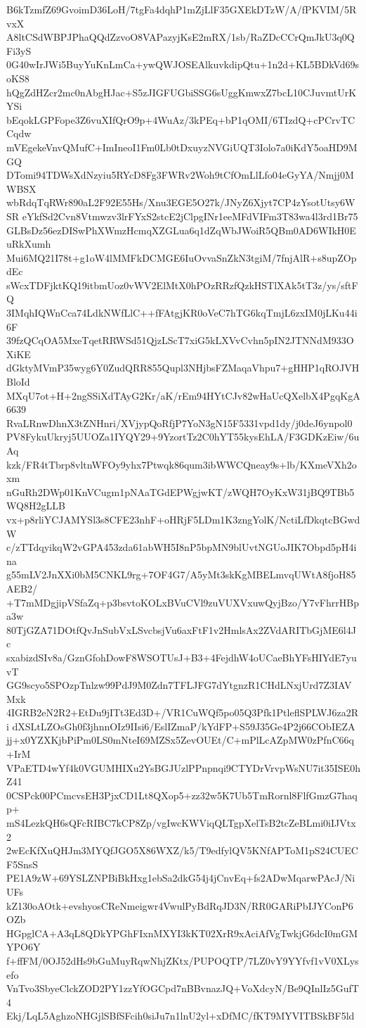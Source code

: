 B6kTzmfZ69GvoimD36LoH/7tgFa4dqhP1mZjLlF35GXEkDTzW/A/fPKVIM/5RvxX
A8ltCSdWBPJPhaQQdZzvoO8VAPazyjKsE2mRX/1sb/RaZDcCCrQmJkU3q0QFi3yS
0G40wIrJWi5BuyYuKnLmCa+ywQWJOSEAlkuvkdipQtu+1n2d+KL5BDkVd69soKS8
hQgZdHZcr2mc0nAbgHJac+S5zJIGFUGbiSSG6sUggKmwxZ7bcL10CJuvmtUrKYSi
bEqokLGPFope3Z6vuXIfQrO9p+4WuAz/3kPEq+bP1qOMI/6TIzdQ+cPCrvTCCqdw
mVEgekeVnvQMufC+ImIneoI1Fm0Lb0tDxuyzNVGiUQT3Iolo7a0iKdY5oaHD9MGQ
DTomi94TDWsXdNzyiu5RYcD8Fg3FWRv2Woh9tCfOmLlLfo04eGyYA/Nmjj0MWBSX
wbRdqTqRWr890aL2F92E55Hs/Xnu3EGE5O27k/JNyZ6Xjyt7CP4zYsotUtsy6WSR
eYkfSd2Cvn8Vtmwzv3lrFYxS2stcE2jClpgINr1eeMFdVIFm3T83wa4l3rd1Br75
GLBsDz56ezDISwPhXWmzHcmqXZGLua6q1dZqWbJWoiR5QBm0AD6WIkH0EuRkXumh
Mui6MQ21I78t+g1oW4lMMFkDCMGE6IuOvvaSnZkN3tgiM/7fnjAlR+s8upZOpdEc
sWcxTDFjktKQ19itbmUoz0vWV2ElMtX0hPOzRRzfQzkHSTlXAk5tT3z/ys/sftFQ
3IMqhIQWnCca74LdkNWfLlC++fFAtgjKR0oVeC7hTG6kqTmjL6zxIM0jLKu44i6F
39fzQCqOA5MxeTqetRRWSd51QjzLScT7xiG5kLXVvCvhn5pIN2JTNNdM933OXiKE
dGktyMVmP35wyg6Y0ZudQRR855Qupl3NHjbsFZMaqaVhpu7+gHHP1qROJVHBloId
MXqU7ot+H+2ngSSiXdTAyG2Kr/aK/rEm94HYtCJv82wHaUcQXelbX4PgqKgA6639
RvaLRnwDhnX3tZNHnri/XVjypQoRfjP7YoN3gN15F5331vpd1dy/j0deJ6ynpol0
PV8FykuUkryj5UUOZa1IYQY29+9YzortTz2C0hYT55kysEhLA/F3GDKzEiw/6uAq
kzk/FR4tTbrp8vltnWFOy9yhx7Ptwqk86qum3ibWWCQneay9s+lb/KXmeVXh2oxm
nGuRh2DWp01KnVCugm1pNAaTGdEPWgjwKT/zWQH7OyKxW31jBQ9TBb5WQ8H2gLLB
vx+p8rliYCJAMYSl3s8CFE23nhF+oHRjF5LDm1K3zngYolK/NctiLfDkqtcBGwdW
c/zTTdqyikqW2vGPA453zda61abWH5I8nP5bpMN9blUvtNGUoJIK7Obpd5pH4ina
g55mLV2JnXXi0bM5CNKL9rg+7OF4G7/A5yMt3skKgMBELmvqUWtA8fjoH85AEB2/
+T7mMDgjipVSfaZq+p3bsvtoKOLxBVuCVl9zuVUXVxuwQyjBzo/Y7vFhrrHBpa3w
80TjGZA71DOtfQvJnSubVxLSvcbsjVu6axFtF1v2HmlsAx2ZVdARITbGjME6l4Jc
sxabizdSIv8a/GznGfohDowF8WSOTUsJ+B3+4FejdhW4oUCaeBhYFsHIYdE7yuvT
GG9scyo5SPOzpTnlzw99PdJ9M0Zdn7TFLJFG7dYtgnzR1CHdLNxjUrd7Z3IAVMxk
4IGRB2eN2R2+EtDu9jITt3Ed3D+/VR1CuWQf5po05Q3Pfk1PtleflSPLWJ6za2Ri
dXSLtLZOsGh0f3jhnnOIz9IIsi6/EslIZmaP/kYdFP+S59J35Ge4P2j66CObIEZA
jj+x0YZXKjbPiPm0LS0mNteI69MZSx5ZevOUEt/C+mPlLcAZpMW0zPfnC66q+IrM
VPaETD4wYf4k0VGUMHIXu2YsBGJUzlPPnpnqi9CTYDrVrvpWsNU7it35ISE0hZ41
0CSPck00PCmcvsEH3PjxCD1Lt8QXop5+zz32w5K7Ub5TmRornl8FlfGmzG7haqp+
mS4LezkQH6sQFcRIBC7kCP8Zp/vgIwcKWViqQLTgpXelTsB2tcZeBLmi0iIJVtx2
2wEcKfXuQHJm3MYQfJGO5X86WXZ/k5/T9edfylQV5KNfAPToM1pS24CUECF5SnsS
PE1A9zW+69YSLZNPBiBkHxg1ebSa2dkG54j4jCnvEq+fs2ADwMqarwPAcJ/NiUFs
kZ130oAOtk+evshyosCReNmeigwr4VwulPyBdRqJD3N/RR0GARiPbIJYConP6OZb
HGpglCA+A3qL8QDkYPGhFIxnMXYI3kKT02XrR9xAciAfVgTwkjG6dcI0mGMYPO6Y
f+ffFM/0OJ52dHs9bGuMuyRqwNhjZKtx/PUPOQTP/7LZ0vY9YYfvf1vV0XLysefo
VnTvo3SbyeClckZOD2PY1zzYfOGCpd7nBBvnazJQ+VoXdcyN/Be9QInlIz5GufT4
Ekj/LqL5AghzoNHGjlSBfSFcih0siJu7n1lnU2yl+xDfMC/fKT9MYVITBSkBF5ld
